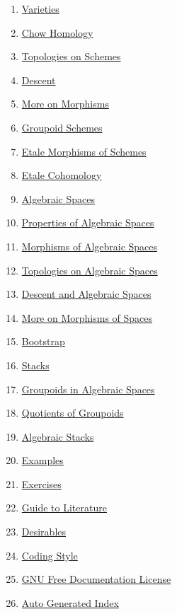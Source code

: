 \begin{multicols}{2}
\begin{enumerate}
\item \hyperref[varieties-section-phantom]{Varieties}
\item \hyperref[chow-section-phantom]{Chow Homology}
\item \hyperref[topologies-section-phantom]{Topologies on Schemes}
\item \hyperref[descent-section-phantom]{Descent}
\item \hyperref[more-morphisms-section-phantom]{More on Morphisms}
\item \hyperref[groupoids-section-phantom]{Groupoid Schemes}
\item \hyperref[etale-section-phantom]{Etale Morphisms of Schemes}
\item \hyperref[etale-cohomology-section-phantom]{Etale Cohomology}
\item \hyperref[spaces-section-phantom]{Algebraic Spaces}
\item \hyperref[spaces-properties-section-phantom]{Properties of Algebraic Spaces}
\item \hyperref[spaces-morphisms-section-phantom]{Morphisms of Algebraic Spaces}
\item \hyperref[spaces-topologies-section-phantom]{Topologies on Algebraic Spaces}
\item \hyperref[spaces-descent-section-phantom]{Descent and Algebraic Spaces}
\item \hyperref[spaces-more-morphisms-section-phantom]{More on Morphisms of Spaces}
\item \hyperref[bootstrap-section-phantom]{Bootstrap}
\item \hyperref[stacks-section-phantom]{Stacks}
\item \hyperref[spaces-groupoids-section-phantom]{Groupoids in Algebraic Spaces}
\item \hyperref[groupoids-quotients-section-phantom]{Quotients of Groupoids}
\item \hyperref[algebraic-section-phantom]{Algebraic Stacks}
\item \hyperref[examples-section-phantom]{Examples}
\item \hyperref[exercises-section-phantom]{Exercises}
\item \hyperref[guide-section-phantom]{Guide to Literature}
\item \hyperref[desirables-section-phantom]{Desirables}
\item \hyperref[coding-section-phantom]{Coding Style}
\item \hyperref[fdl-section-phantom]{GNU Free Documentation License}
\item \hyperref[index-section-phantom]{Auto Generated Index}
\end{enumerate}
\end{multicols}
